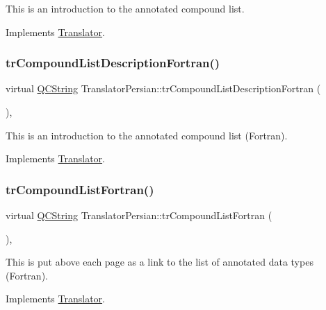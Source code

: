 This is an introduction to the annotated compound list. 

Implements \mbox{\hyperlink{class_translator}{Translator}}.

\mbox{\label{class_translator_persian_a338b1e1fff787968f75c402eee15e0d6}} 
\subsubsection{\texorpdfstring{trCompoundListDescriptionFortran()}{trCompoundListDescriptionFortran()}}
{\footnotesize\ttfamily virtual \mbox{\hyperlink{class_q_c_string}{Q\+C\+String}} Translator\+Persian\+::tr\+Compound\+List\+Description\+Fortran (\begin{DoxyParamCaption}{ }\end{DoxyParamCaption})\hspace{0.3cm}{\ttfamily [inline]}, {\ttfamily [virtual]}}

This is an introduction to the annotated compound list (Fortran). 

Implements \mbox{\hyperlink{class_translator}{Translator}}.

\mbox{\label{class_translator_persian_a1dac216e341c67144e19d96de69a5321}} 
\subsubsection{\texorpdfstring{trCompoundListFortran()}{trCompoundListFortran()}}
{\footnotesize\ttfamily virtual \mbox{\hyperlink{class_q_c_string}{Q\+C\+String}} Translator\+Persian\+::tr\+Compound\+List\+Fortran (\begin{DoxyParamCaption}{ }\end{DoxyParamCaption})\hspace{0.3cm}{\ttfamily [inline]}, {\ttfamily [virtual]}}

This is put above each page as a link to the list of annotated data types (Fortran). 

Implements \mbox{\hyperlink{class_translator}{Translator}}.

